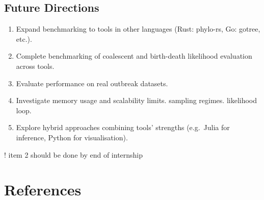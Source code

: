 \documentclass[11pt, a4paper]{article}
\begin{document}
\subsection{Future Directions}

\begin{enumerate}
    \item Expand benchmarking to tools in other languages (Rust: phylo-rs, Go: gotree, etc.). 
    \item Complete benchmarking of coalescent and birth-death likelihood evaluation
          across tools.
    \item Evaluate performance on real outbreak datasets.
    \item Investigate memory usage and scalability limits.
          sampling regimes.
          likelihood loop.
    \item Explore hybrid approaches combining tools' strengths (e.g.\ Julia for
          inference, Python for visualisation).
\end{enumerate}
! item 2 should be done by end of internship 

\section{References}
\end{document}
